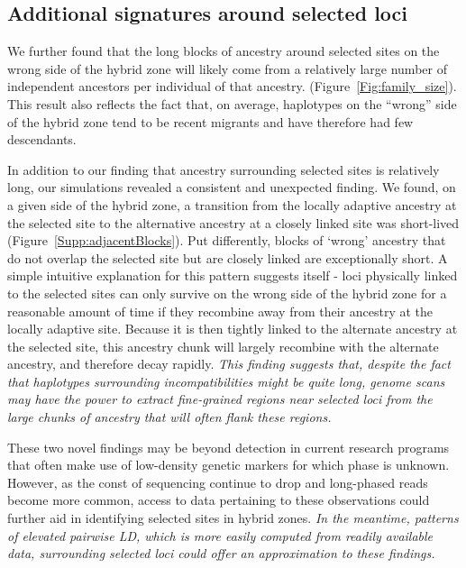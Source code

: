 \documentclass[11pt,letterpaper]{article}
\newcommand{\alisa}[1]{{\em \color{red} #1}}
\newcommand{\yb}[1]{{\em \color{magenta} #1}}
\begin{document}
\subsection*{Additional signatures around selected loci} 

We further found that the long blocks of ancestry around selected sites on the wrong side of the hybrid zone will likely come from a relatively large number of independent ancestors per individual of that ancestry. (Figure~\ref{Fig:family_size}). %
This result also reflects the fact that, on average, haplotypes on the ``wrong'' side of the hybrid zone tend to be recent migrants and have therefore had few descendants. 

In addition to our finding that ancestry surrounding selected sites is relatively long, our simulations revealed a consistent and unexpected finding. We found, on a given side of the hybrid zone, a transition from the locally adaptive ancestry at the selected site to the alternative ancestry at a closely linked site was short-lived (Figure~\ref{Supp:adjacentBlocks}). Put differently, blocks of `wrong' ancestry that do not overlap the selected site but are closely linked are exceptionally short. A simple intuitive explanation for this pattern suggests itself - loci physically linked to the selected sites can only survive on the wrong side of the hybrid zone for a reasonable amount of time if they recombine away from their ancestry at the locally adaptive site. Because it is then tightly linked to the alternate ancestry at the selected site, this ancestry chunk will largely recombine with the alternate ancestry, and therefore decay rapidly. \yb{This finding suggests that, despite the fact that haplotypes surrounding incompatibilities might be quite long, genome scans may have the power to extract fine-grained regions near selected loci from the large chunks of ancestry that will often flank these regions.}

These two novel findings may be beyond detection in current research programs that often make use of low-density genetic markers for which phase is unknown. However, as the const of sequencing continue to drop and long-phased reads become more common, access to data pertaining to these observations could further aid in identifying selected sites in hybrid zones.  %
\alisa{In the meantime, patterns of elevated pairwise LD, which is more easily computed from readily available data, surrounding selected loci could offer an approximation to these findings.}
\end{document}

